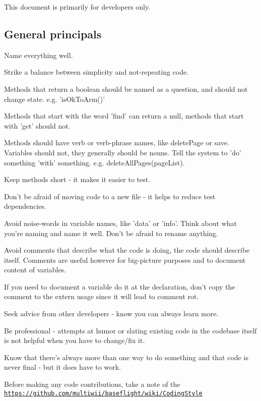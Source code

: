 This document is primarily for developers only.

\subsection*{General principals}


\begin{DoxyEnumerate}
\item Name everything well.
\item Strike a balance between simplicity and not-\/repeating code.
\item Methods that return a boolean should be named as a question, and should not change state. e.\+g. 'is\+Ok\+To\+Arm()'
\item Methods that start with the word 'find' can return a null, methods that start with 'get' should not.
\item Methods should have verb or verb-\/phrase names, like {\ttfamily delete\+Page} or {\ttfamily save}. Variables should not, they generally should be nouns. Tell the system to 'do' something 'with' something. e.\+g. delete\+All\+Pages(page\+List).
\item Keep methods short -\/ it makes it easier to test.
\item Don't be afraid of moving code to a new file -\/ it helps to reduce test dependencies.
\item Avoid noise-\/words in variable names, like 'data' or 'info'. Think about what you're naming and name it well. Don't be afraid to rename anything.
\item Avoid comments that describe what the code is doing, the code should describe itself. Comments are useful however for big-\/picture purposes and to document content of variables.
\item If you need to document a variable do it at the declaration, don't copy the comment to the {\ttfamily extern} usage since it will lead to comment rot.
\item Seek advice from other developers -\/ know you can always learn more.
\item Be professional -\/ attempts at humor or slating existing code in the codebase itself is not helpful when you have to change/fix it.
\item Know that there's always more than one way to do something and that code is never final -\/ but it does have to work.
\end{DoxyEnumerate}

Before making any code contributions, take a note of the \href{https://github.com/multiwii/baseflight/wiki/CodingStyle}{\tt https\+://github.\+com/multiwii/baseflight/wiki/\+Coding\+Style}

